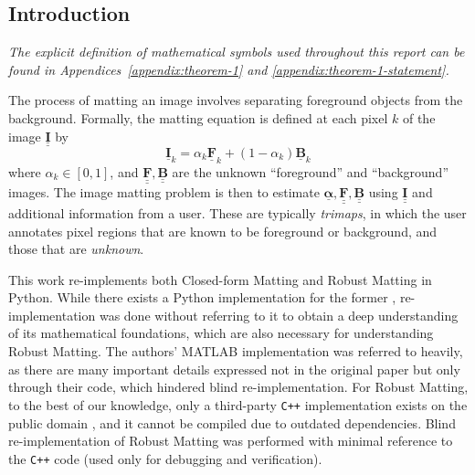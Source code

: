 \documentclass{article}
\theoremstyle{definition}
\def\vt#1{\underline{\mathbf{#1}}}
\def\vts#1{\underline{\boldsymbol{#1}}}
\def\mt#1{\underline{\underline{\mathbf{#1}}}}
\begin{document}
\begin{multicols}{2}[]




\section{Introduction}

\emph{The explicit definition of mathematical symbols used throughout this report can be found in Appendices~\ref{appendix:theorem-1} and \ref{appendix:theorem-1-statement}.}

The process of matting an image involves separating foreground objects from the background. Formally, the matting equation is defined at each pixel $k$ of the image $\mt I$ by $$\vt I_k = \alpha_{k} \vt F_{k}  + (1-\alpha_k) \vt B_k$$
where $\alpha_{k}\in[0,1]$, and $\mt F, \mt B$ are the unknown ``foreground'' and ``background'' images.   %
The image matting problem is then to estimate $\vts \alpha, \mt F, \mt B$ using $\mt I$ and additional information from a user. These are typically \emph{trimaps}, in which the user annotates pixel regions that are known to be foreground or background, and those that are \emph{unknown}.  %

This work re-implements both Closed-form Matting \cite{closed-form-matting} and Robust Matting \cite{robust-matting} in Python. While there exists a Python implementation for the former \cite{web:closed-form-python-github}, re-implementation was done without referring to it to obtain a deep understanding of its mathematical foundations, which are also necessary for understanding Robust Matting. The authors' MATLAB implementation was referred to heavily, as there are many important details expressed not in the original paper but only through their code, which hindered blind re-implementation. For Robust Matting, to the best of our knowledge, only a third-party \verb|C++| implementation exists on the public domain \cite{web:robust-cpp-github}, and it cannot be compiled due to outdated dependencies. Blind re-implementation of Robust Matting was performed with minimal reference to the \verb|C++| code (used only for debugging and verification).


\end{multicols}
\end{document}
